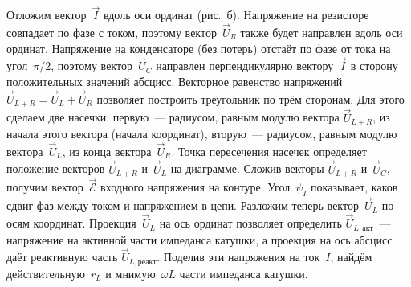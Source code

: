 \documentclass[a4paper,oneside]{book}
\begin{document}
Отложим вектор~$\vec I$ вдоль оси ординат (рис.~б). Напряжение на
резисторе совпадает по фазе с током, поэтому вектор~$\vec U_R$ также будет
направлен вдоль оси ординат. Напряжение на конденсаторе (без потерь) отстаёт по
фазе от тока на угол~$\pi/2$, поэтому вектор~$\vec U_C$ направлен
перпендикулярно вектору~$\vec I$ в сторону положительных значений абсцисс.
Векторное равенство напряжений $\vec U_{L+R}=\vec U_L+\vec U_R$ позволяет
построить треугольник по трём сторонам. Для этого сделаем две насечки:
первую~--- радиусом, равным модулю вектора $\vec U_{L+R}$, из начала этого
вектора (начала координат), вторую~--- радиусом, равным модулю вектора~$\vec
U_L$, из конца вектора~$\vec U_R$. Точка пересечения насечек определяет
положение векторов $\vec U_{L+R}$ и~$\vec U_L$ на диаграмме. Сложив векторы
$\vec{U}_{L+R}$ и~$\vec U_C$, получим вектор~$\vec{\mathcal{E}}$ входного
напряжения на контуре. Угол~$\psi_I$ показывает, каков сдвиг фаз между током и
напряжением в цепи. Разложим теперь вектор~$\vec U_L$ по осям координат.
Проекция~$\vec U_L$ на ось ординат позволяет определить $\vec
U_{L,\text{акт}}$~--- напряжение на активной части импеданса катушки, а проекция
на ось абсцисс даёт реактивную часть $\vec U_{L,\text{реакт}}$. Поделив эти
напряжения на ток~$I$, найдём действительную~$r_L$ и мнимую~$\omega L$ части
импеданса катушки.
\end{document}
